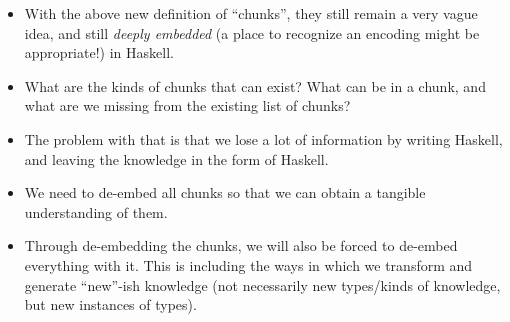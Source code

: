 \begin{itemize}

      \item With the above new definition of ``chunks'', they still remain a very
            vague idea, and still \textit{deeply embedded} (a place to recognize an
            encoding might be appropriate!) in Haskell.

      \item What are the kinds of chunks that can exist? What can be in a chunk,
            and what are we missing from the existing list of chunks?

      \item The problem with that is that we lose a lot of information by writing
            Haskell, and leaving the knowledge in the form of Haskell.

      \item We need to de-embed all chunks so that we can obtain a tangible
            understanding of them.

      \item Through de-embedding the chunks, we will also be forced to de-embed
            everything with it. This is including the ways in which we transform
            and generate ``new''-ish knowledge (not necessarily new types/kinds of
            knowledge, but new instances of types).

\end{itemize}
